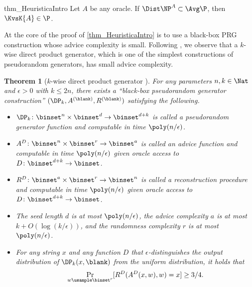 \documentclass[11pt]{article}
\numberwithin{equation}{section}
\newtheorem{theorem}{Theorem}[section]
\theoremstyle{definition}
\theoremstyle{plain}
\begin{document}
\begin{remindertheorem}
  {thm_HeuristicaIntro}
  Let $A$ be any oracle.
  If $\Dist\NP^A \subset \Avg\P$,
  then $\KvsK{A} \in \P$.
\end{remindertheorem}



%
%
%
%
%
%
%
%
%
%
%
%
%
%

At the core of the proof of \cref{thm_HeuristicaIntro} is to use a black-box PRG construction whose advice complexity is small.
%
%
Following \cite{Hirahara20_stoc_conf},
we observe that a $k$-wise direct product generator, which is one of the simplest constructions of pseudorandom generators,
has small advice complexity.

\begin{theorem}
  [$k$-wise direct product generator \cite{Hirahara20_stoc_conf}]
  \label{thm_DPConstruction}
  For any parameters $n, k \in \Nat$ and $\epsilon > 0$ with $k \le 2n$,
  there exists a ``black-box pseudorandom generator construction'' $(\DP_k, A^{(\blank)}, R^{(\blank)})$
  satisfying the following.
  \begin{itemize}
    \item
          $\DP_k \colon \binset^n \times \binset^d \to \binset^{d + k}$
          is called a \emph{pseudorandom generator function}
          and computable in time $\poly(n / \epsilon)$.
    \item
          $A^D \colon \binset^n \times \binset^r \to \binset^a$
          is called an \emph{advice function}
          and computable in time $\poly(n / \epsilon)$ given oracle access to
          $D \colon \binset^{d+k} \to \binset$.
    \item
          $R^D \colon \binset^a \times \binset^r \to \binset^n$
          is called a \emph{reconstruction procedure}
          and computable in time $\poly(n / \epsilon)$ given oracle access to
          $D \colon \binset^{d+k} \to \binset$.
    \item
          The seed length $d$ is at most $\poly(n / \epsilon)$,
          the advice complexity $a$ is at most $k + O(\log (k / \epsilon))$,
          and
          the randomness complexity $r$ is at most $\poly(n / \epsilon)$.
    \item
          For any string $x$ and any function $D$ that $\epsilon$-distinguishes
          the output distribution of $\DP_k(x, \blank)$
          from the uniform distribution,
          it holds that
          $$
            \Pr_{w \usample \binset^r}[ R^D(A^D(x, w), w) = x ] \ge 3 / 4.
          $$
  \end{itemize}
\end{theorem}
\end{document}
